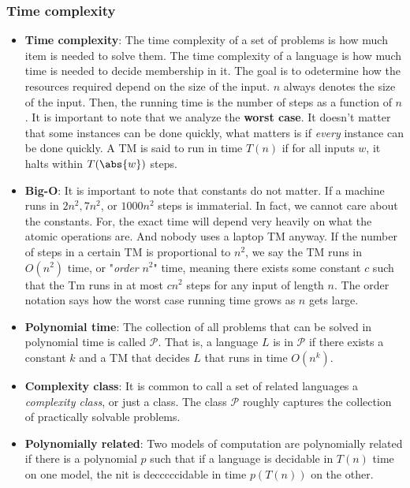 \documentclass{report}
\begin{document}
    \subsubsection{Time complexity}
    \begin{itemize}
        \item \textbf{Time complexity}: The time complexity of a set of problems is how much item is needed to solve them. The time complexity of a language is how much time is needed to decide membership in it.
            \bigbreak \noindent 
            The goal is to odetermine how the resources required depend on the size of the input. $n$ always denotes the size of the input. Then, the running time is the number of steps as a function of $n$.
            \bigbreak \noindent 
            It is important to note that we analyze the \textbf{worst case}. It doesn't matter that some instances can be done quickly, what matters is if \textit{every} instance can be done quickly. A TM is said to run in time $T(n) $ if for all inputs $w$, it halts within $T(\abs{w}) $ steps.
        \item \textbf{Big-O}: It is important to note that constants do not matter. If a machine runs in  $2n^{2}, 7n^{2}$, or $ 1000n^{2}$ steps is immaterial. In fact, we cannot care about the constants. For, the exact time will depend very heavily on what the atomic operations are. And nobody uses a laptop TM anyway. If the number of steps in a certain TM is proportional to $n^{2}$, we say the TM runs in $O(n^{2}) $ time, or "\textit{order} $n^{2} $" time, meaning there exists some constant $c$ such that the Tm runs in at most $cn^{2}$ steps for any input of length $n$. The order notation says how the worst case running time grows as $n$ gets large.
        \item \textbf{Polynomial time}: The collection of all problems that can be solved in polynomial time is called $\mathcal{P}$. That is, a language $L$ is in $\mathcal{P}$ if there exists a constant $k$ and a TM that decides $L$ that runs in time $O(n^{k})$.
        \item \textbf{Complexity class}: It is common to call a set of related languages a \textit{complexity class}, or just a class. The class $\mathcal{P}$ roughly captures the collection of practically solvable problems. 
        \item \textbf{Polynomially related}: Two models of computation are polynomially related if there is a polynomial $p$ such that if a language is decidable in $T(n)$ time on one model, the nit is decccccidable in time $p(T(n)) $ on the other.

\end{itemize}
\end{document}
